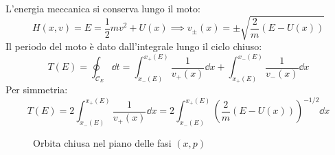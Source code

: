 L'energia meccanica si conserva lungo il moto:
\begin{equation}
    H(x,v) = E = \frac{1}{2}mv^2 + U(x) \implies v_\pm(x) = \pm\sqrt{\frac{2}{m}(E - U(x))}
\end{equation}
Il periodo del moto è dato dall'integrale lungo il ciclo chiuso:
\begin{equation}
    T(E) = \oint_{\mathcal{C}_E} \dd{t} = \int_{x_-(E)}^{x_+(E)} \frac{1}{v_+(x)} \dd{x} + \int_{x_+(E)}^{x_-(E)} \frac{1}{v_-(x)} \dd{x}
\end{equation}
Per simmetria:
\begin{equation}
    T(E) = 2 \int_{x_-(E)}^{x_+(E)} \frac{1}{v_+(x)} \dd{x} = 2 \int_{x_-(E)}^{x_+(E)} \left( \frac{2}{m} (E - U(x)) \right)^{-1/2} \dd{x}
\end{equation}
\begin{figure}[ht]
    \centering
    \caption{Orbita chiusa nel piano delle fasi $(x, p)$}
\end{figure}

